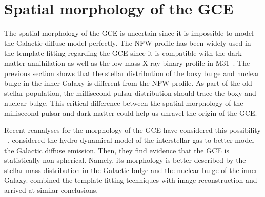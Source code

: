 \documentclass[doublespace,nopageskip]{VTthesis} %
\begin{document}
\section{Spatial morphology of the GCE}

The spatial morphology of the GCE is uncertain since it is impossible to model the Galactic diffuse model perfectly. The NFW profile has been widely used in the template fitting regarding the GCE since it is compatible with the dark matter annihilation as well as the low-mass X-ray binary profile in M31~\cite{2012PhRvD..86h3511A}. The previous section shows that the stellar distribution of the boxy bulge and nuclear bulge in the inner Galaxy is different from the NFW profile. As part of the old stellar population, the millisecond pulsar distribution should trace the boxy and nuclear bulge. This critical difference between the spatial morphology of the millisecond pulsar and dark matter could help us unravel the origin of the GCE.

Recent reanalyses for the morphology of the GCE have considered this possibility ~\citep{2018NatAs...2..387M,2018NatAs...2..819B,2019JCAP...09..042M, 2020PhRvD.102d3012A}. \citet{2018NatAs...2..387M} considered the hydro-dynamical model of the interstellar gas to better model the Galactic diffuse emission. Then, they find evidence that the GCE is statistically non-spherical. Namely, its morphology is better described by the stellar mass distribution in the Galactic bulge and the nuclear bulge of the inner Galaxy. \citet{2018NatAs...2..819B} combined the template-fitting techniques with image reconstruction and arrived at similar conclusions.



\end{document}
